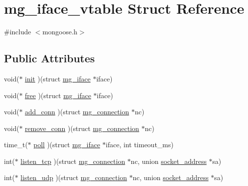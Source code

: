 \hypertarget{structmg__iface__vtable}{}\section{mg\+\_\+iface\+\_\+vtable Struct Reference}
\label{structmg__iface__vtable}


{\ttfamily \#include $<$mongoose.\+h$>$}

\subsection*{Public Attributes}
\begin{DoxyCompactItemize}
\item 
void($\ast$ \hyperlink{structmg__iface__vtable_a66915ed7fbcef057c33bb6dfa3d8a8ee_a66915ed7fbcef057c33bb6dfa3d8a8ee}{init} )(struct \hyperlink{structmg__iface}{mg\+\_\+iface} $\ast$iface)
\item 
void($\ast$ \hyperlink{structmg__iface__vtable_a267ee7de0f5c3f0eedee5ee5d093a810_a267ee7de0f5c3f0eedee5ee5d093a810}{free} )(struct \hyperlink{structmg__iface}{mg\+\_\+iface} $\ast$iface)
\item 
void($\ast$ \hyperlink{structmg__iface__vtable_a1b09df656c627c217c4f8efebef85a1e_a1b09df656c627c217c4f8efebef85a1e}{add\+\_\+conn} )(struct \hyperlink{structmg__connection}{mg\+\_\+connection} $\ast$nc)
\item 
void($\ast$ \hyperlink{structmg__iface__vtable_a3b76727f620579f2e5b2b18c346e71b4_a3b76727f620579f2e5b2b18c346e71b4}{remove\+\_\+conn} )(struct \hyperlink{structmg__connection}{mg\+\_\+connection} $\ast$nc)
\item 
time\+\_\+t($\ast$ \hyperlink{structmg__iface__vtable_a11baf939815da0f0fc71f27692f907a5_a11baf939815da0f0fc71f27692f907a5}{poll} )(struct \hyperlink{structmg__iface}{mg\+\_\+iface} $\ast$iface, int timeout\+\_\+ms)
\item 
int($\ast$ \hyperlink{structmg__iface__vtable_a8b75b7e0f1ebd12f00580756ffdbda28_a8b75b7e0f1ebd12f00580756ffdbda28}{listen\+\_\+tcp} )(struct \hyperlink{structmg__connection}{mg\+\_\+connection} $\ast$nc, union \hyperlink{unionsocket__address}{socket\+\_\+address} $\ast$sa)
\item 
int($\ast$ \hyperlink{structmg__iface__vtable_a940fbc2eecb7353136647724d6f4cb39_a940fbc2eecb7353136647724d6f4cb39}{listen\+\_\+udp} )(struct \hyperlink{structmg__connection}{mg\+\_\+connection} $\ast$nc, union \hyperlink{unionsocket__address}{socket\+\_\+address} $\ast$sa)

\end{DoxyCompactItemize}
